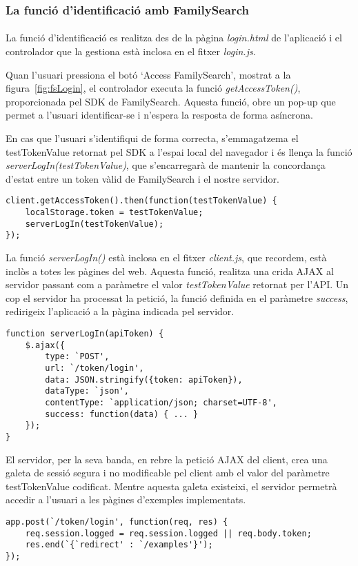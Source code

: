 \subsubsection{La funció d'identificació amb FamilySearch}

\paragraph{}
La funció d'identificació es realitza des de la pàgina \emph{login.html} de l'aplicació i el controlador que la gestiona està inclosa en el fitxer \emph{login.js}.

Quan l'usuari pressiona el botó `Access FamilySearch', mostrat a la figura~\ref{fig:fsLogin}, el controlador executa la funció \emph{getAccessToken()}, proporcionada pel SDK de FamilySearch. Aquesta funció, obre un pop-up que permet a l'usuari identificar-se i n'espera la resposta de forma asíncrona.

En cas que l'usuari s'identifiqui de forma correcta, s'emmagatzema el testTokenValue retornat pel SDK a l'espai local del navegador i és llença la funció \emph{serverLogIn(testTokenValue)}, que s'encarregarà de mantenir la concordança d'estat entre un token vàlid de FamilySearch i el nostre servidor.

\begin{lstlisting}[style=rawOwn,caption={Petició al SDK de Javascript d'un token d'identificació}]
client.getAccessToken().then(function(testTokenValue) {
    localStorage.token = testTokenValue;
    serverLogIn(testTokenValue);
});
\end{lstlisting}

La funció \emph{serverLogIn()} està inclosa en el fitxer \emph{client.js}, que recordem, està inclòs a totes les pàgines del web. Aquesta funció, realitza una crida AJAX al servidor passant com a paràmetre el valor \emph{testTokenValue} retornat per l'API. Un cop el servidor ha processat la petició, la funció definida en el paràmetre \emph{success}, redirigeix l'aplicació a la pàgina indicada pel servidor.

\begin{lstlisting}[style=rawOwn,caption={Crida AJAX al servidor amb el token retornat pel SDK}]
function serverLogIn(apiToken) {
    $.ajax({
        type: `POST',
        url: `/token/login',
        data: JSON.stringify({token: apiToken}),
        dataType: `json',
        contentType: `application/json; charset=UTF-8',
        success: function(data) { ... }
    });
}
\end{lstlisting}

El servidor, per la seva banda, en rebre la petició AJAX del client, crea una galeta de sessió segura i no modificable pel client amb el valor del paràmetre testTokenValue codificat. Mentre aquesta galeta existeixi, el servidor permetrà accedir a l'usuari a les pàgines d'exemples implementats.

\begin{lstlisting}[style=rawOwn,caption={Petició POST d'identificació processada pel servidor}]
app.post(`/token/login', function(req, res) {
    req.session.logged = req.session.logged || req.body.token;
    res.end(`{`redirect' : `/examples'}');
});
\end{lstlisting}
